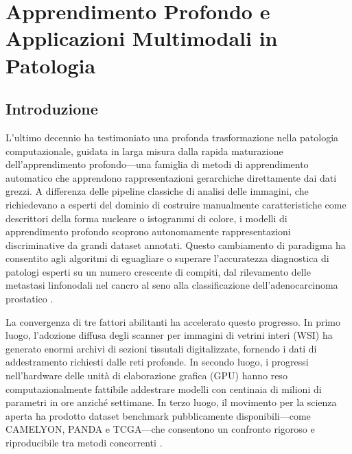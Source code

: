 
\chapter{Apprendimento Profondo e Applicazioni Multimodali in Patologia}
\label{ch:4}

\section{Introduzione}
\label{sec:ch4_intro}

L'ultimo decennio ha testimoniato una profonda trasformazione nella patologia computazionale, guidata in larga misura dalla rapida maturazione dell'apprendimento profondo---una famiglia di metodi di apprendimento automatico che apprendono rappresentazioni gerarchiche direttamente dai dati grezzi. A differenza delle pipeline classiche di analisi delle immagini, che richiedevano a esperti del dominio di costruire manualmente caratteristiche come descrittori della forma nucleare o istogrammi di colore, i modelli di apprendimento profondo scoprono autonomamente rappresentazioni discriminative da grandi dataset annotati. Questo cambiamento di paradigma ha consentito agli algoritmi di eguagliare o superare l'accuratezza diagnostica di patologi esperti su un numero crescente di compiti, dal rilevamento delle metastasi linfonodali nel cancro al seno alla classificazione dell'adenocarcinoma prostatico \cite{ehteshami2017,bulten2022}.

La convergenza di tre fattori abilitanti ha accelerato questo progresso. In primo luogo, l'adozione diffusa degli scanner per immagini di vetrini interi (WSI) ha generato enormi archivi di sezioni tissutali digitalizzate, fornendo i dati di addestramento richiesti dalle reti profonde. In secondo luogo, i progressi nell'hardware delle unità di elaborazione grafica (GPU) hanno reso computazionalmente fattibile addestrare modelli con centinaia di milioni di parametri in ore anziché settimane. In terzo luogo, il movimento per la scienza aperta ha prodotto dataset benchmark pubblicamente disponibili---come CAMELYON, PANDA e TCGA---che consentono un confronto rigoroso e riproducibile tra metodi concorrenti \cite{campanella2019,song2023}.

